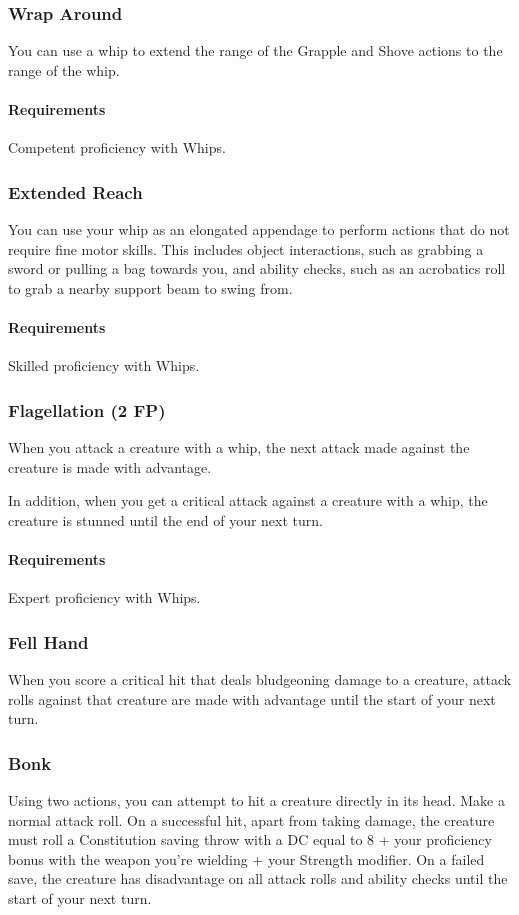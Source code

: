 \subsubsection{Wrap Around} \label{feat::wraparound}
    You can use a whip to extend the range of the Grapple and Shove actions to the range of the whip.
    \paragraph{Requirements} Competent proficiency with Whips.
\subsubsection{Extended Reach} \label{feat::extendedreach}
    You can use your whip as an elongated appendage to perform actions that do not require fine motor skills.
    This includes object interactions, such as grabbing a sword or pulling a bag towards you, and ability checks, such as an acrobatics roll to grab a nearby support beam to swing from.
    \paragraph{Requirements} Skilled proficiency with Whips.
\subsubsection{Flagellation (2 FP)} \label{feat::flagellation}
    When you attack a creature with a whip, the next attack made against the creature is made with advantage.

    In addition, when you get a critical attack against a creature with a whip, the creature is stunned until the end of your next turn.
    \paragraph{Requirements} Expert proficiency with Whips.

\subsubsection{Fell Hand} \label{feat::fellhand}
    When you score a critical hit that deals bludgeoning damage to a creature, attack rolls against that creature are made with advantage until the start of your next turn.
\subsubsection{Bonk} \label{feat::bonk}
    Using two actions, you can attempt to hit a creature directly in its head.
    Make a normal attack roll.
    On a successful hit, apart from taking damage, the creature must roll a Constitution saving throw with a DC equal to 8 + your proficiency bonus with the weapon you're wielding + your Strength modifier.
    On a failed save, the creature has disadvantage on all attack rolls and ability checks until the start of your next turn.

